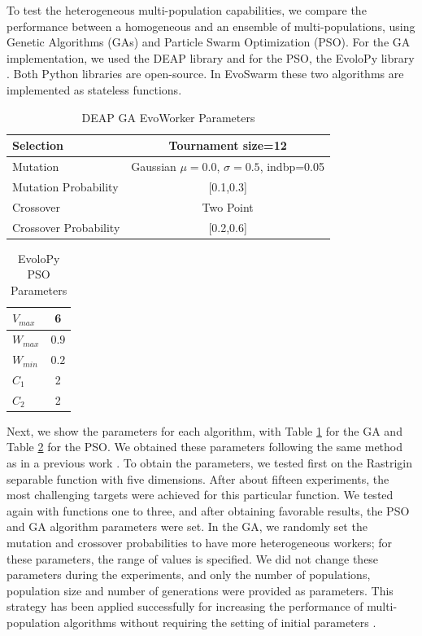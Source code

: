 \documentclass[review]{elsarticle}
\begin{document}
To test the heterogeneous multi-population capabilities,  we compare the
performance between a homogeneous and an ensemble of multi-populations, using
Genetic Algorithms (GAs) and Particle Swarm Optimization (PSO). For the GA
implementation, we used the DEAP library \cite{fortin2012deap} and for the PSO,
the EvoloPy library \cite{faris2016evolopy}. Both Python libraries are
open-source. In EvoSwarm these two algorithms are implemented as stateless
functions.

\begin{table}[h!tbp]
  \small
  \caption{DEAP GA EvoWorker Parameters }
  \label{tab:GAparams} 
  \centering
  \small
  \begin{tabular}{|l|c|}
    \hline
    Selection & Tournament size=12                            \\ \hline
    Mutation & Gaussian $\mu=0.0$, $\sigma=0.5$, indbp=0.05   \\ \hline
    Mutation Probability & [0.1,0.3]                          \\ \hline
    Crossover & Two Point                                     \\ \hline
    Crossover Probability  & [0.2,0.6]                          \\ \hline
  \end{tabular}
\end{table}
%
\begin{table}[h!tbp]
  \small
  \caption{ EvoloPy PSO Parameters }
  \label{tab:PSOparams} 
  \centering
  \small
  \begin{tabular}{|l|c|}
    \hline
    $V_{max}$ & 6 \\ \hline
    $W_{max}$ & $0.9$ \\ \hline
    $W_{min}$ & $0.2$ \\ \hline
    $C_1$ & 2 \\ \hline
    $C_2$ & 2 \\ \hline
  \end{tabular}
\end{table}

Next, we show the parameters for each algorithm, with Table \ref{tab:GAparams} for
the GA and Table \ref{tab:PSOparams} for the PSO. We obtained these parameters
following the same method as in a previous work \cite{garcia2017benchmarking}.
To obtain the parameters, we tested first on the Rastrigin separable function
with five dimensions. After about fifteen experiments, the most challenging
targets were achieved for this particular function. We tested again with
functions one to three, and after obtaining favorable results, the PSO and GA
algorithm parameters were set. In the GA, we randomly set the mutation and
crossover probabilities to have more heterogeneous workers;
for these parameters, the range of values is specified. We did not change these parameters during the 
experiments, and only the number of populations, population size and number of generations were
provided as parameters. This strategy has been applied successfully for increasing 
the performance of multi-population algorithms without requiring the setting 
of initial parameters \cite{garcia2014randomized}.
\end{document}
